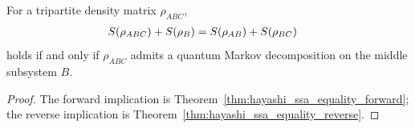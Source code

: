 \begin{theorem}
    \label{thm:hayashi_ssa_equality_characterization}
    \leanok
    For a tripartite density matrix $\rho_{ABC}$,
    \begin{align}
        S(\rho_{ABC})+S(\rho_B)
        &=
        S(\rho_{AB})+S(\rho_{BC})
        \notag
    \end{align}
    holds if and only if $\rho_{ABC}$ admits a quantum Markov decomposition on
    the middle subsystem $B$.
\end{theorem}

\begin{proof}\leanok
    The forward implication is
    Theorem~\ref{thm:hayashi_ssa_equality_forward}; the reverse implication is
    Theorem~\ref{thm:hayashi_ssa_equality_reverse}.
\end{proof}
